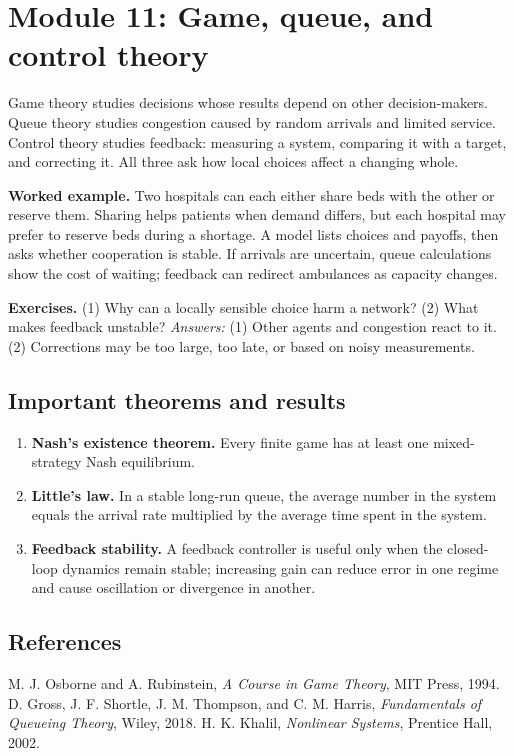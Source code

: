 \documentclass[11pt,oneside]{book}
\makeatletter
\renewenvironment{thebibliography}[1]
  {\list{\@biblabel{\@arabic\c@enumiv}}%
    {\settowidth\labelwidth{\@biblabel{#1}}%
     \leftmargin\labelwidth
     \advance\leftmargin\labelsep
     \usecounter{enumiv}%
     \let\p@enumiv\@empty
     \renewcommand\theenumiv{\@arabic\c@enumiv}}}
  {\endlist}
\makeatother
\begin{document}
\chapter[Module 11]{Module 11: Game, queue, and control theory}
Game theory studies decisions whose results depend on other decision-makers. Queue theory studies congestion caused by random arrivals and limited service. Control theory studies feedback: measuring a system, comparing it with a target, and correcting it. All three ask how local choices affect a changing whole.

\textbf{Worked example.} Two hospitals can each either share beds with the other or reserve them. Sharing helps patients when demand differs, but each hospital may prefer to reserve beds during a shortage. A model lists choices and payoffs, then asks whether cooperation is stable. If arrivals are uncertain, queue calculations show the cost of waiting; feedback can redirect ambulances as capacity changes.

\textbf{Exercises.} (1) Why can a locally sensible choice harm a network? (2) What makes feedback unstable? \emph{Answers:} (1) Other agents and congestion react to it. (2) Corrections may be too large, too late, or based on noisy measurements.

\section*{Important theorems and results}
\begin{enumerate}[leftmargin=*,itemsep=0.35em]
\item \textbf{Nash's existence theorem.} Every finite game has at least one mixed-strategy Nash equilibrium.

\item \textbf{Little's law.} In a stable long-run queue, the average number in the system equals the arrival rate multiplied by the average time spent in the system.

\item \textbf{Feedback stability.} A feedback controller is useful only when the closed-loop dynamics remain stable; increasing gain can reduce error in one regime and cause oscillation or divergence in another.
\end{enumerate}

\section*{References}
\begin{thebibliography}{9}
 M. J. Osborne and A. Rubinstein, \emph{A Course in Game Theory}, MIT Press, 1994.
 D. Gross, J. F. Shortle, J. M. Thompson, and C. M. Harris, \emph{Fundamentals of Queueing Theory}, Wiley, 2018.
 H. K. Khalil, \emph{Nonlinear Systems}, Prentice Hall, 2002.
\end{thebibliography}
\end{document}
